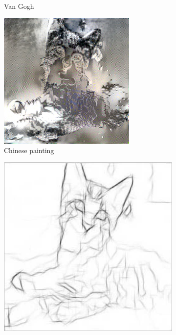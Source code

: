 \documentclass[10pt,twocolumn,letterpaper]{article}
\begin{document}
\begin{figure}
\begin{subfigure}[b]{0.18\textwidth}
    \caption{Van Gogh}
    \label{fig::base14}
  \end{subfigure}
  \begin{subfigure}[b]{0.18\textwidth}
    \includegraphics[width=\textwidth]{figure/baseline2/chinese.jpg}
    \caption{Chinese painting}
    \label{fig::base15}
  \end{subfigure}
  \caption{Baseline 1: Extract edge with canny algorithm and feed AWAST directly}
  \label{fig::cannyonly}
  \begin{subfigure}[b]{0.18\textwidth}
    \includegraphics[width=\textwidth]{figure/baseline4/sketch.jpg}

\end{subfigure}
\end{figure}
\end{document}
